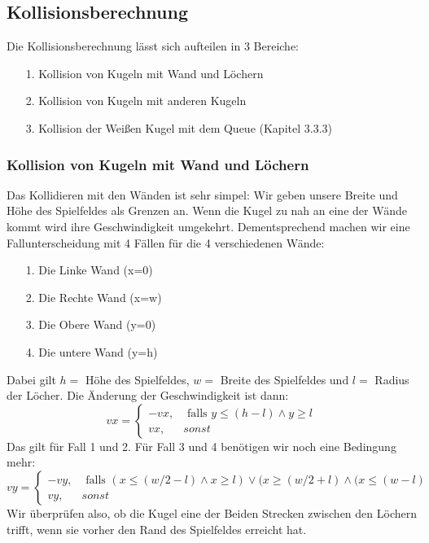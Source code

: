 \subsection{Kollisionsberechnung}
	Die Kollisionsberechnung lässt sich aufteilen in 3 Bereiche: \begin{itemize}
		\item [1.] Kollision von Kugeln mit Wand und Löchern
		\item [2.] Kollision von Kugeln mit anderen Kugeln
		\item [3.] Kollision der Weißen Kugel mit dem Queue (Kapitel 3.3.3)
	\end{itemize}
	\subsubsection{Kollision von Kugeln mit Wand und Löchern}
		Das Kollidieren mit den Wänden ist sehr simpel: Wir geben  unsere Breite und Höhe des Spielfeldes als Grenzen an. Wenn die Kugel zu nah an eine der Wände kommt wird ihre Geschwindigkeit umgekehrt. Dementsprechend machen wir eine Fallunterscheidung mit 4 Fällen für die 4 verschiedenen Wände: \begin{itemize}
			\item [1.] Die Linke Wand (x=0)
			\item [2.] Die Rechte Wand (x=w)
			\item [3.] Die Obere Wand (y=0)
			\item [4.] Die untere Wand (y=h)
		\end{itemize}
		Dabei gilt $ h = $ Höhe des Spielfeldes, $ w = $ Breite des Spielfeldes und $l = $ Radius der Löcher.
		Die Änderung der Geschwindigkeit ist dann:
		\begin{equation}
		vx = \begin{cases}
			-vx, & \text{ falls } y \leq (h- l) \land y \geq l\\
			vx, & sonst 
		\end{cases}
		\end{equation}
		Das gilt für Fall 1 und 2. Für Fall 3 und 4 benötigen wir noch eine Bedingung mehr:
		 \begin{equation}
		vy = \begin{cases}
		-vy, & \text{ falls } (x \leq (w/2 - l) \land x \geq l) \lor (x \geq (w/2 + l) \land (x \leq (w- l) \\
		vy, & sonst 
		\end{cases}
		\end{equation}
		Wir überprüfen also, ob die Kugel eine der Beiden Strecken zwischen den Löchern trifft, wenn sie vorher den Rand des Spielfeldes erreicht hat. 
